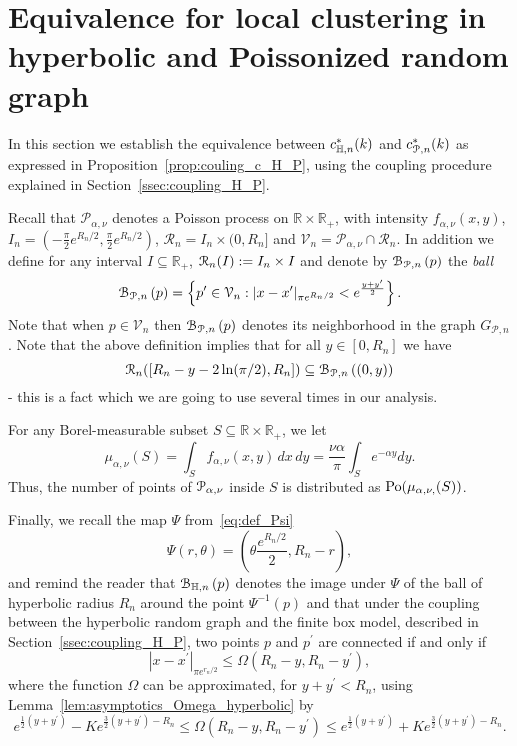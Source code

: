 \section{Equivalence for local clustering in hyperbolic and Poissonized random graph}\label{sec:coupling_H_P_n}

In this section we establish the equivalence between $c_{\mathbb{H},n}^\ast(k)$ and $c_{{\mathcal P},n}^\ast(k)$ as expressed in Proposition~\ref{prop:couling_c_H_P}, using the coupling procedure explained in Section~\ref{ssec:coupling_H_P}. 

Recall that $\mathcal{P}_{\alpha,\nu}$ denotes a Poisson process on $\mathbb{R} \times \mathbb{R}_+$, with intensity $f_{\alpha,\nu}(x,y)$, $I_n = \left(-\frac{\pi}{2}e^{R_n/2}, \frac{\pi}{2}e^{R_n/2}\right)$, $\mathcal{R}_n = I_n \times (0,R_n]$ and $\mathcal{V}_n = \mathcal{P}_{\alpha, \nu}\cap \mathcal{R}_n$. In addition we define for any interval $I \subseteq \mathbb{R}_+$, ${\mathcal R}_n(I) := I_n \times I$ and denote by ${\mathcal B}_{{\mathcal P},n}\left(p\right)$ the \emph{ball}
\[
	{\mathcal B}_{{\mathcal P},n}\left(p\right) = \left\{p^\prime \in \mathcal{V}_n : |x - x^\prime |_{\pi e^{R_n/2}} < e^{\frac{y+y^\prime}{2}}\right\}.
\]
Note that when $p \in \mathcal{V}_n$ then ${\mathcal B}_{{\mathcal P},n}\left(p\right)$ denotes its neighborhood in the graph $G_{\mathcal{P},n}$. 
Note that the above definition implies that for all $y\in [0,R_n]$ we have 
\begin{equation} \label{eq:upper_ballPo_inclusion}
{\mathcal R}_n([R_n-y - 2\ln (\pi/2), R_n]) \subseteq {\mathcal B}_{{\mathcal P},n}\left((0,y)\right)
\end{equation}
- this is a fact which we are going to use several times in our analysis. 

For any Borel-measurable subset $S \subseteq \mathbb{R} \times \mathbb{R}_+$, we let 
\[
	\mu_{\alpha, \nu} (S) = \int_S f_{\alpha, \nu}(x,y) \, dx \, dy = \frac{\nu \alpha}{\pi}\int_S e^{-\alpha y}dy.
\]
Thus, the number of points of ${\mathcal P}_{\alpha, \nu}$ inside $S$ is distributed as ${\mathrm{Po}} ({\mu_{\alpha, \nu,} (S)})$.

Finally, we recall the map $\Psi$ from~\eqref{eq:def_Psi}
\[
	\Psi(r,\theta) = \left(\theta \frac{e^{R_n/2}}{2}, R_n - r\right),
\] 
and remind the reader that ${\mathcal B}_{\mathbb{H},n}\left(p\right)$ denotes the image under $\Psi$ of the ball of hyperbolic radius $R_n$ around the point $\Psi^{-1}(p)$ and that under the coupling between the hyperbolic random graph and the finite box model, described in Section~\ref{ssec:coupling_H_P}, two points $p$ and $p^\prime$ are connected if and only if
\[
	|x-x^\prime|_{\pi e^{r_n/2}} \le \Omega(R_n - y, R_n - y^\prime),
\]
where the function $\Omega$ can be approximated, for $y + y^\prime < R_n$, using Lemma~\ref{lem:asymptotics_Omega_hyperbolic} by  
\[
	e^{\frac{1}{2}(y+y^\prime)} - K e^{\frac{3}{2}(y+y^\prime) - R_n} \leq \Omega(R_n - y, R_n - y^\prime) 
		\leq  e^{\frac{1}{2}(y+y^\prime)} + K e^{\frac{3}{2}(y+y^\prime) - R_n}.
\]

